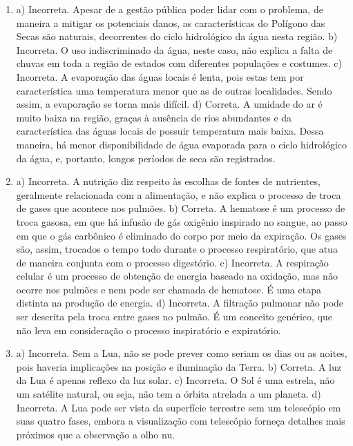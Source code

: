 \begin{enumerate}
\item
a) Incorreta. Apesar de a gestão pública poder lidar com o problema, de
maneira a mitigar os potenciais danos, as características do Polígono das
Secas são naturais, decorrentes do ciclo hidrológico da água nesta
região.
b) Incorreta. O uso indiscriminado da água, neste caso, não explica a
falta de chuvas em toda a região de estados com diferentes populações e
costumes. 
c) Incorreta. A evaporação das águas locais é lenta, pois estas tem por
característica uma temperatura menor que as de outras localidades. Sendo
assim, a evaporação se torna mais difícil.
d) Correta. A umidade do ar é muito baixa na região, graças à ausência
de rios abundantes e da característica das águas locais de possuir
temperatura mais baixa. Dessa maneira, há menor disponibilidade de água
evaporada para o ciclo hidrológico da água, e, portanto, longos períodos
de seca são registrados.

\item
a) Incorreta. A nutrição diz respeito às escolhas de fontes de
nutrientes, geralmente relacionada com a alimentação, e não explica o
processo de troca de gases que acontece nos pulmões.
b) Correta. A hematose é um processo de troca gasosa, em que há infusão
de gás oxigênio inspirado no sangue, ao passo em que o gás carbônico é
eliminado do corpo por meio da expiração. Os gases são, assim, trocados
o tempo todo durante o processo respiratório, que atua de maneira
conjunta com o processo digestório.
c) Incorreta. A respiração celular é um processo de obtenção de energia
baseado na oxidação, mas não ocorre nos pulmões e nem pode ser chamada
de hematose. É uma etapa distinta na produção de energia.
d) Incorreta. A filtração pulmonar não pode ser descrita pela troca
entre gases no pulmão. É um conceito genérico, que não leva em
consideração o processo inspiratório e expiratório.

\item
a) Incorreta. Sem a Lua, não se pode prever como seriam os dias ou as
noites, pois haveria implicações na posição e iluminação da
Terra.
b) Correta. A luz da Lua é apenas reflexo da luz solar.
c) Incorreta. O Sol é uma estrela, não um satélite natural, ou seja, não
tem a órbita atrelada a um planeta.
d) Incorreta. A Lua pode ser vista da superfície terrestre sem um
telescópio em suas quatro fases, embora a visualização com telescópio
forneça detalhes mais próximos que a observação a olho nu.
\end{enumerate}


